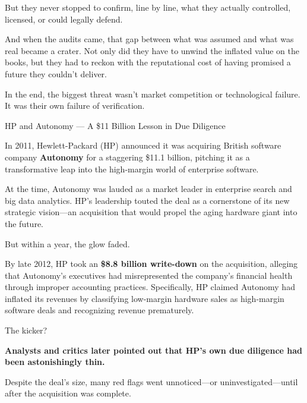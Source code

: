 But they never stopped to confirm, line by line, what they actually controlled, licensed, or could legally defend.

And when the audits came, that gap between what was assumed and what was real became a crater.
Not only did they have to unwind the inflated value on the books, but 
they had to reckon with the reputational cost of having promised a future they couldn’t deliver.

In the end, the biggest threat wasn’t market competition or technological failure.
It was their own failure of verification.

\medskip

\begin{HistoricalSidebar}{HP and Autonomy --- A \$11 Billion Lesson in Due Diligence}

    In 2011, Hewlett-Packard (HP) announced it was acquiring British software company \textbf{Autonomy} for a staggering \$11.1 billion, pitching it as a transformative leap into the high-margin world of enterprise software.

    \medskip
    
    At the time, Autonomy was lauded as a market leader in enterprise search and big data analytics. HP’s leadership touted the deal as a cornerstone of its new strategic vision—an acquisition that would propel the aging hardware giant into the future.

    \medskip
    
    But within a year, the glow faded.
    
    \medskip
    
    By late 2012, HP took an \textbf{\$8.8 billion write-down} on the acquisition, alleging that Autonomy’s executives had misrepresented the company’s financial health through improper accounting practices.
    Specifically, HP claimed Autonomy had inflated its revenues by classifying low-margin hardware sales as high-margin software deals and recognizing revenue prematurely.
    
    \medskip
    
    The kicker?

    \medskip
    
    \textbf{Analysts and critics later pointed out that HP’s own due diligence had been astonishingly thin.}

    \medskip

    Despite the deal’s size, many red flags went unnoticed—or uninvestigated—until after the acquisition was complete.
    

\end{HistoricalSidebar}
